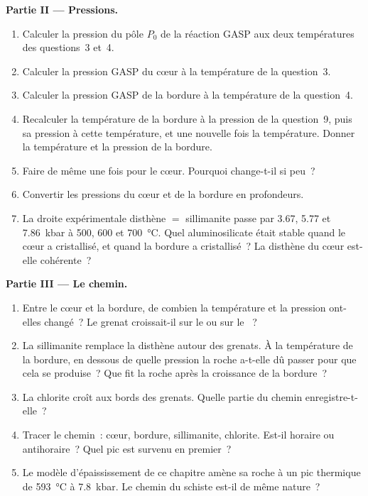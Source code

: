 \begin{problem}
\noindent\textbf{Partie II --- Pressions.}
\begin{enumerate}[resume]
\item Calculer la pression du pôle $P_0$ de la réaction GASP aux deux températures
des questions~3 et~4.
\item Calculer la pression GASP du cœur à la température de la question~3.
\item Calculer la pression GASP de la bordure à la température de la question~4.
\item Recalculer la température de la bordure à la pression de la question~9, puis sa
pression à cette température, et une nouvelle fois la température. Donner la température et la
pression de la bordure.
\item Faire de même une fois pour le cœur. Pourquoi change-t-il si peu~?
\item Convertir les pressions du cœur et de la bordure en profondeurs.
\item La droite expérimentale disthène $=$ sillimanite passe par 3.67, 5.77 et
\qty{7.86}{kbar} à 500, 600 et \qty{700}{\celsius}. Quel aluminosilicate était stable
quand le cœur a cristallisé, et quand la bordure a cristallisé~? La disthène du cœur est-elle cohérente~?
\end{enumerate}

\noindent\textbf{Partie III --- Le chemin.}
\begin{enumerate}[resume]
\item Entre le cœur et la bordure, de combien la température et la pression ont-elles changé~?
Le grenat croissait-il sur le  ou sur le ~?
\item La sillimanite remplace la disthène autour des grenats. À la température de la bordure,
en dessous de quelle pression la roche a-t-elle dû passer pour que cela se produise~? Que fit la roche
après la croissance de la bordure~?
\item La chlorite croît aux bords des grenats. Quelle partie du chemin enregistre-t-elle~?
\item Tracer le chemin~: cœur, bordure, sillimanite, chlorite. Est-il horaire ou antihoraire~?
Quel pic est survenu en premier~?
\item Le modèle d'épaississement de ce chapitre amène sa roche à un pic thermique de
\qty{593}{\celsius} à \qty{7.8}{kbar}. Le chemin du schiste est-il de même nature~?
\end{enumerate}


\end{problem}
